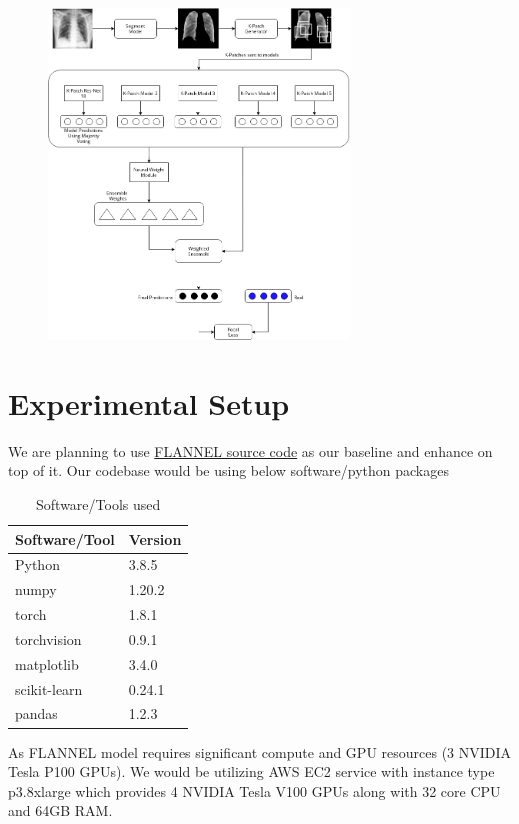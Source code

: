 \documentclass{sigkddExp}
\begin{document}
\begin{figure}[h]
    \includegraphics[width=8cm]{../doc/images/FLANNEL-IMPROVED.png}
\end{figure}


\section{Experimental Setup}

We are planning to use \href{https://github.com/qxiaobu/FLANNEL} {FLANNEL source
code}  as our baseline and enhance on top of it. Our codebase would be
using below software/python packages
\begin{table}[H]
    \centering
    \caption{Software/Tools used}
    \begin{tabular}{|l|l|} \hline
        Software/Tool&Version\\ \hline
        Python&3.8.5\\ \hline
        numpy &1.20.2\\ \hline
        torch &1.8.1\\ \hline
        torchvision &0.9.1\\ \hline
        matplotlib &3.4.0\\ \hline
        scikit-learn &0.24.1\\ \hline
        pandas &1.2.3\\
        \hline\end{tabular}
    \end{table}

As FLANNEL model requires significant compute and GPU
resources (3 NVIDIA Tesla P100 GPUs). We would be utilizing AWS EC2 service with
instance type p3.8xlarge which provides 4 NVIDIA Tesla V100 GPUs along with 32
core CPU and 64GB RAM.
\end{document}
